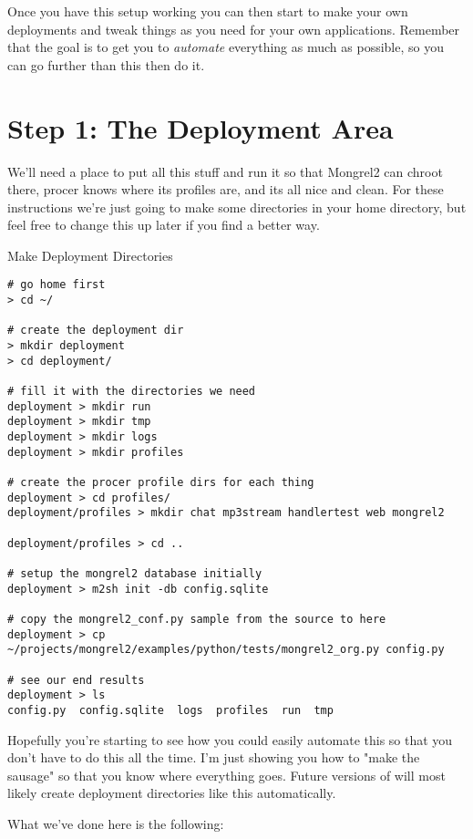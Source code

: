 Once you have this setup working you can then start to make your own
deployments and tweak things as you need for your own applications.  Remember
that the goal is to get you to \emph{automate} everything as much as possible,
so you can go further than this then do it.

\section{Step 1: The Deployment Area}

We'll need a place to put all this stuff and run it so that Mongrel2 can chroot
there, procer knows where its profiles are, and its all nice and clean.  For these
instructions we're just going to make some directories in your home directory,
but feel free to change this up later if you find a better way.

\begin{code}{Make Deployment Directories}
\begin{Verbatim}
# go home first
> cd ~/

# create the deployment dir
> mkdir deployment
> cd deployment/

# fill it with the directories we need
deployment > mkdir run
deployment > mkdir tmp
deployment > mkdir logs
deployment > mkdir profiles

# create the procer profile dirs for each thing
deployment > cd profiles/
deployment/profiles > mkdir chat mp3stream handlertest web mongrel2

deployment/profiles > cd ..

# setup the mongrel2 database initially
deployment > m2sh init -db config.sqlite

# copy the mongrel2_conf.py sample from the source to here
deployment > cp ~/projects/mongrel2/examples/python/tests/mongrel2_org.py config.py

# see our end results
deployment > ls
config.py  config.sqlite  logs	profiles  run  tmp

\end{Verbatim}
\end{code}

Hopefully you're starting to see how you could easily automate this so that you don't
have to do this all the time.  I'm just showing you how to "make the sausage" so that
you know where everything goes.  Future versions of  will most likely 
create deployment directories like this automatically.

What we've done here is the following:

